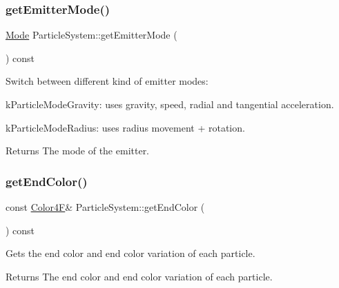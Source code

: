 \subsubsection{\texorpdfstring{get\+Emitter\+Mode()}{getEmitterMode()}\hspace{0.1cm}{\footnotesize\ttfamily [2/2]}}
{\footnotesize\ttfamily \hyperlink{classParticleSystem_aa380bd1c6062c44d56268a61ade9c8fb}{Mode} Particle\+System\+::get\+Emitter\+Mode (\begin{DoxyParamCaption}{ }\end{DoxyParamCaption}) const\hspace{0.3cm}{\ttfamily [inline]}}

Switch between different kind of emitter modes\+:
\begin{DoxyItemize}
\item k\+Particle\+Mode\+Gravity\+: uses gravity, speed, radial and tangential acceleration.
\item k\+Particle\+Mode\+Radius\+: uses radius movement + rotation.

\begin{DoxyReturn}{Returns}
The mode of the emitter. 
\end{DoxyReturn}

\end{DoxyItemize}\mbox{\label{classParticleSystem_ae7213ec605cb6436ccde6b243961869c}} 
\subsubsection{\texorpdfstring{get\+End\+Color()}{getEndColor()}\hspace{0.1cm}{\footnotesize\ttfamily [1/2]}}
{\footnotesize\ttfamily const \hyperlink{structColor4F}{Color4F}\& Particle\+System\+::get\+End\+Color (\begin{DoxyParamCaption}{ }\end{DoxyParamCaption}) const\hspace{0.3cm}{\ttfamily [inline]}}

Gets the end color and end color variation of each particle.

\begin{DoxyReturn}{Returns}
The end color and end color variation of each particle. 
\end{DoxyReturn}
\mbox{\label{classParticleSystem_ae7213ec605cb6436ccde6b243961869c}} 
